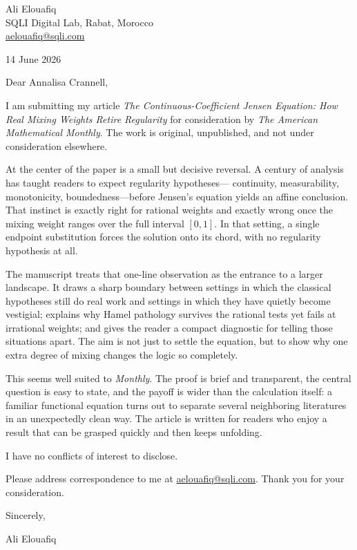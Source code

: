 \documentclass[12pt]{article}
\begin{document}
Ali Elouafiq\\
SQLI Digital Lab, Rabat, Morocco\\
\href{mailto:aelouafiq@sqli.com}{aelouafiq@sqli.com}

14 June 2026

Dear Annalisa Crannell,

I am submitting my article \textit{The Continuous-Coefficient Jensen
Equation: How Real Mixing Weights Retire Regularity} for consideration
by \textit{The American Mathematical Monthly}. The work is original,
unpublished, and not under consideration elsewhere.

At the center of the paper is a small but decisive reversal. A century
of analysis has taught readers to expect regularity hypotheses---
continuity, measurability, monotonicity, boundedness---before Jensen's
equation yields an affine conclusion. That instinct is exactly right
for rational weights and exactly wrong once the mixing weight ranges
over the full interval $[0,1]$. In that setting, a single endpoint
substitution forces the solution onto its chord, with no regularity
hypothesis at all.

The manuscript treats that one-line observation as the entrance to a
larger landscape. It draws a sharp boundary between settings in which
the classical hypotheses still do real work and settings in which they
have quietly become vestigial; explains why Hamel pathology survives the
rational tests yet fails at irrational weights; and gives the reader a
compact diagnostic for telling those situations apart. The aim is not
just to settle the equation, but to show why one extra degree of mixing
changes the logic so completely.

This seems well suited to \textit{Monthly}. The proof is brief and
transparent, the central question is easy to state, and the payoff is
wider than the calculation itself: a familiar functional equation turns
out to separate several neighboring literatures in an unexpectedly
clean way. The article is written for readers who enjoy a result that
can be grasped quickly and then keeps unfolding.

I have no conflicts of interest to disclose.

Please address correspondence to me at
\href{mailto:aelouafiq@sqli.com}{aelouafiq@sqli.com}.
Thank you for your consideration.

Sincerely,

\vspace{16pt}
Ali Elouafiq
\end{document}
